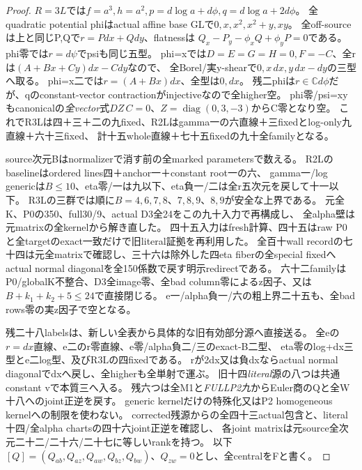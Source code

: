 \documentclass[a4paper,11pt]{ltjsarticle}
\theoremstyle{definition}
\begin{document}
\begin{proof}
$R=3L$では$f=a^3,h=a^2,p=d\log a+d\phi,q=d\log a+2d\phi$。
全quadratic potential phiはactual affine base GLで$0,x,x^2,x^2+y,xy$。
全off-sourceは上と同じP,Qで$r=Pdx+Qdy$、flatnessは
$Q_x-P_y-\phi_xQ+\phi_yP=0$である。
phi零では$r=d\psi$でpsiも同じ五型。
phi=xでは$D=E=G=H=0,F=-C$、全rは$(A+Bx+Cy)dx-Cdy$なので、
全Borel/実y-shearで$0,x\,dx,y\,dx-dy$の三型へ取る。
phi=x二では$r=(A+Bx)dx$、全型は$0,dx$。
残二phiは$r\in\mathbb C d\phi$だが、qのconstant-vector contractionがinjectiveなので全higher空。
phi零/psi=xyもcanonicalの\emph{全vector}式$DZ\,C=0$、$Z=\operatorname{diag}(0,3,-3)$からC零となり空。
これでR3Lは四＋三＋二の九fixed、R2Lはgamma一の六直線＋三fixedとlog-only九直線＋六十三fixed、
計十五whole直線＋七十五fixedの九十全familyとなる。

source次元Bはnormalizerで消す前の全marked parametersで数える。
R2Lのbaselineはordered lines四＋anchor一＋constant root一の六、
gamma一/log genericは$B\le10$、eta零/一は九以下、eta負一/二は全r五次元を戻して十一以下。
R3Lの三群では順に$B=4,6,7,8$、$7,8,9$、$8,9$が安全な上界である。
元全K、P0の350、full30/9、actual D3全24をこの九十入力で再構成し、
全alpha壁は元matrixの全kernelから解き直した。
四十五入力はfresh計算、四十五はraw P0と全targetのexact一致だけで旧literal証拠を再利用した。
全百十wall recordの七十四は元全matrixで確認し、三十六は除外した四eta fiberの全special fixedへ
actual normal diagonalを全150係数で戻す明示redirectである。
六十二familyはP0/globalK不整合、D3全image零、全bad column零によるz因子、又は
$B+k_1+k_2+5\le24$で直接閉じる。
e一/alpha負一/六の粗上界二十五も、全bad rows零の実z因子で空となる。

残二十八labelsは、新しい全表から具体的な旧有効部分源へ直接送る。
全eの$r=dx$直線、e二のr零直線、e零/alpha負二/三のexact-B二型、
eta零のlog+dx三型とe二log型、及びR3Lの四fixedである。
rが2dx又は負dxならactual normal diagonalでdxへ戻し、全higherも全単射で運ぶ。
旧十四\emph{literal}源の八つは共通constant vで本質三へ入る。
残六つは全M1と\emph{FULLP2九}からEuler商のQと全W十八へのjoint正逆を戻す。
generic kernelだけの特殊化又はP2 homogeneous kernelへの制限を使わない。
corrected残源からの全四十三actual包含と、literal十四/全alpha chartsの四十六joint正逆を確認し、
各joint matrixは元source全次元二十二/二十六/二十七に等しいrankを持つ。
以下$[Q]=(Q_{ab},Q_{az},Q_{aw},Q_{bz},Q_{bw})$、$Q_{zw}=0$とし、全centralをFと書く。


\end{proof}
\end{document}
